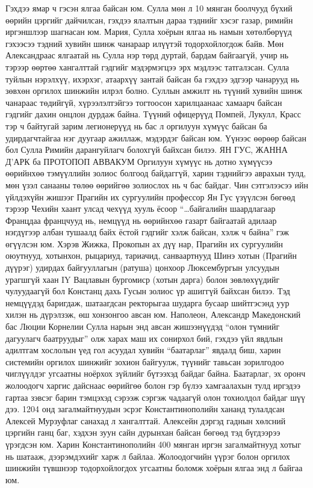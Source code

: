 Гэхдээ ямар ч гэсэн ялгаа байсан юм. Сулла мөн л 10 мянган боолчууд бүхий өөрийн цэргийг дайчилсан, гэхдээ ялалтын дараа тэднийг хэсэг газар, римийн иргэншлээр шагнасан юм. Мария, Сулла хоёрын ялгаа нь намын хөтөлбөрүүд гэхээсээ тэдний хувийн шинж чанараар илүүтэй тодорхойлогдож байв. Мөн Александраас ялгаатай нь Сулла нэр төрд дуртай, бардам байгаагүй, учир нь тэрээр өөртөө хангалттай гэдгийг мэдэрмэгцээ эрх мэдлээс татгалзсан. Сулла туйлын нэрэлхүү, ихэрхэг, атаархүү зантай байсан ба гэхдээ эдгээр чанарууд нь зөвхөн оргилох шинжийн илрэл болно. Суллын амжилт нь түүний хувийн шинж чанараас төдийгүй, хүрээлэлтэйгээ тогтоосон харилцаанаас хамаарч байсан гэдгийг дахин онцлон дурдаж байна. Түүний офицерүүд Помпей, Лукулл, Красс тэр ч байтугай зарим легионерүүд нь бас л оргилуун хүмүүс байсан ба удирдагчтайгаа нэг дуугаар ажиллаж, мэдэрдэг байсан юм. Үүнээс өөрөөр байсан бол Сулла Римийн дарангуйлагч болохгүй байхсан билээ.
ЯН ГУС, ЖАННА Д’АРК ба ПРОТОПОП АВВАКУМ
Оргилуун хүмүүс нь дотно хүмүүсээ өөрийнхөө тэмүүллийн золиос болгоод байдаггүй, харин тэднийгээ аврахын тулд, мөн үзэл санааны төлөө өөрийгөө золиослох нь ч бас байдаг. Чин сэтгэлээсээ ийн үйлдэхүйн жишээг Прагийн их сургуулийн профессор Ян Гус үзүүлсэн бөгөөд тэрээр Чехийн хаант улсад чехүүд хууль ёсоор “…байгалийн шаардлагаар Францдаа францчууд нь, немцүүд нь өөрийнхөө газарт байгаатай адилаар нэгдүгээр албан тушаалд байх ёстой гэдгийг хэлж байсан, хэлж ч байна” гэж өгүүлсэн юм. Хэрэв Жижка, Прокопын ах дүү нар, Прагийн их сургуулийн оюутнууд, хотынхон, рыцариуд, тариачид, санваартнууд Шинэ хотын (Прагийн дүүрэг) удирдах байгууллагын (ратуша) цонхоор Люксембургын улсуудын урагшгүй хаан IY Вацлавын бургомиср (хотын дарга) болон зөвлөхүүдийг чулуудаагүй бол Констанц дахь Гусын золиос үр ашиггүй байхсан билээ. Тэд немцүүдэд баригдаж, шатаагдсан ректорыгаа шударга бусаар шийтгэсэнд уур хилэн нь дүрэлзэж, өш хонзонгоо авсан юм.
Наполеон, Александр Македонский бас Люции Корнелии Сулла нарын энд авсан жишээнүүдэд “олон түмнийг дагуулагч баатруудыг” олж харах маш их сонирхол бий, гэхдээ үйл явдлын адилтгам хослолын үед гол асуудал хувийн “баатарлаг” явдалд биш, харин системийн оргилох шинжийг зохион байгуулж, түүнийг тавьсан зорилгодоо чиглүүлдэг угсаатны ноёрхох зүйлийг бүтээхэд байдаг байна. Баатарлаг, эх оронч жолоодогч харгис дайснаас өөрийгөө болон гэр бүлээ хамгаалахын тулд иргэдээ гартаа зэвсэг барин тэмцэхэд сэрээж сэргэж чадаагүй олон тохиолдол байдаг шүү дээ. 1204 онд загалмайтнуудын эсрэг Константинополийн хананд тулалдсан Алексей Мурзуфлаг санахад л хангалттай. Алексейн дэргэд гаднын хөлсний цэргийн ганц баг, хэдхэн зуун сайн дурынхан байсан бөгөөд тэд бүгдээрээ үрэгдсэн юм. Харин Константинополийн 400 мянган иргэн загалмайтнууд хотыг нь шатааж, дээрэмдэхийг харж л байлаа. Жолоодогчийн үүрэг болон оргилох шинжийн түвшнээр тодорхойлогдох угсаатны боломж хоёрын ялгаа энд л байгаа юм.
